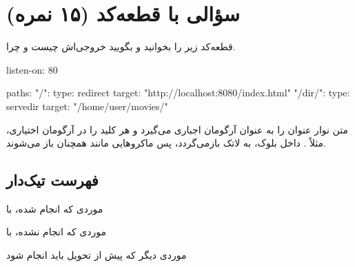 \section{سؤالی با قطعه‌کد (۱۵ نمره)}

قطعه‌کد زیر را بخوانید و بگویید خروجی‌اش چیست و چرا.

\begin{neocode}[neocodetitlefont=\small]{}
listen-on: 80

paths:
  "/":
    type: redirect
    target: "http://localhost:8080/index.html"
  "/dir/":
    type: servedir
    target: "/home/user/movies/"
\end{neocode}

 متن نوار عنوان را به عنوان آرگومان اجباری می‌گیرد و هر
کلید  را در آرگومان اختیاری، مثلاً
\lr{\texttt{[listing options=\{language=Python\}]}}. داخل بلوک،
 به لاتک بازمی‌گردد، پس ماکروهایی مانند
 همچنان باز می‌شوند.

\subsection{فهرست تیک‌دار}

\begin{neochecklist}
    \citem موردی که انجام شده، با 
    \item موردی که انجام نشده، با 
    \item موردی دیگر که پیش از تحویل باید انجام شود
\end{neochecklist}
